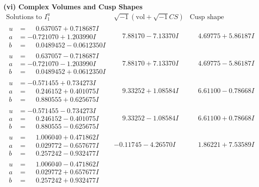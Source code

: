 \documentclass[1p]{elsarticle_modified}
\theoremstyle{definition}
\newcommand{\I}{\sqrt{-1}}
\begin{document}
\newpage\flushleft \textbf{(vi) Complex Volumes and Cusp Shapes}
$$\begin{array}{c|c|c}  
\text{Solutions to }I^u_{1}& \I (\text{vol} + \sqrt{-1}CS) & \text{Cusp shape}\\
 \hline 
\begin{aligned}
u &= \phantom{-}0.637057 + 0.718687 I \\
a &= -0.721070 + 1.203990 I \\
b &= \phantom{-}0.0489452 - 0.0612350 I\end{aligned}
 & \phantom{-}7.88170 - 7.13370 I & \phantom{-}4.69775 + 5.86187 I \\ \hline\begin{aligned}
u &= \phantom{-}0.637057 - 0.718687 I \\
a &= -0.721070 - 1.203990 I \\
b &= \phantom{-}0.0489452 + 0.0612350 I\end{aligned}
 & \phantom{-}7.88170 + 7.13370 I & \phantom{-}4.69775 - 5.86187 I \\ \hline\begin{aligned}
u &= -0.571455 + 0.734273 I \\
a &= \phantom{-}0.246152 + 0.401075 I \\
b &= \phantom{-}0.880555 + 0.625675 I\end{aligned}
 & \phantom{-}9.33252 + 1.08584 I & \phantom{-}6.61100 - 0.78668 I \\ \hline\begin{aligned}
u &= -0.571455 - 0.734273 I \\
a &= \phantom{-}0.246152 - 0.401075 I \\
b &= \phantom{-}0.880555 - 0.625675 I\end{aligned}
 & \phantom{-}9.33252 - 1.08584 I & \phantom{-}6.61100 + 0.78668 I \\ \hline\begin{aligned}
u &= \phantom{-}1.006040 + 0.471862 I \\
a &= \phantom{-}0.029772 - 0.657677 I \\
b &= \phantom{-}0.257242 - 0.932477 I\end{aligned}
 & -0.11745 - 4.26570 I & \phantom{-}1.86221 + 7.53589 I \\ \hline\begin{aligned}
u &= \phantom{-}1.006040 - 0.471862 I \\
a &= \phantom{-}0.029772 + 0.657677 I \\
b &= \phantom{-}0.257242 + 0.932477 I\end{aligned}

\end{array}$$
\end{document}
